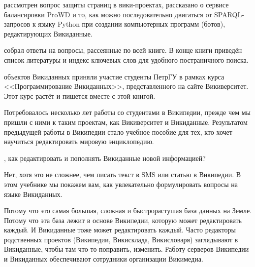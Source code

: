 рассмотрен вопрос защиты страниц в вики-проектах, 
рассказано о сервисе балансировки ProWD 
 и то, как можно последовательно двигаться от SPARQL-запросов 
к языку Python при создании компьютерных программ (ботов), редактирующих Викиданные. 


собрал ответы на вопросы, рассеянные по всей книге. 
В конце книги приведён список литературы 
и индекс ключевых слов для удобного постраничного поиска.

 объектов Викиданных приняли участие студенты ПетрГУ в рамках курса <<Программирование Викиданных>>, 
представленного на сайте Викиверситет. 
Этот курс растёт и пишется вместе с этой книгой. 

Потребовалось несколько лет работы со студентами в Википедии, прежде чем мы пришли с ними к таким проектам, 
как Викиверситет и Викиданные. 
Результатом предыдущей работы в Википедии стало учебное пособие для тех, 
кто хочет научиться редактировать мировую энциклопедию\autocite{Krizhanovsky2015}.



, 
как редактировать и пополнять Викиданные новой информацией? 

Нет, хотя это не сложнее, чем писать текст в SMS 
или статью в Википедии. В этом учебнике мы покажем вам, 
как увлекательно формулировать вопросы на языке Викиданных. 



Потому что это самая большая, сложная 
и быстрорастушая база данных на Земле. 
Потому что эта база лежит в основе Википедии, которую может редактировать каждый.
И Викиданные тоже может редактировать каждый. 
Часто редакторы родственных проектов (Википедии, Викисклада, Викисловаря) 
заглядывают в Викиданные, чтобы там что-то поправить, изменить. 
Работу серверов Википедии и Викиданных обеспечивают сотрудники организации Викимедиа. 




